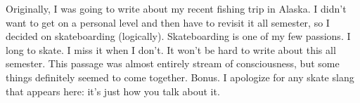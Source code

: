 Originally, I was going to write about my recent fishing trip in Alaska. I didn't want to get on a personal level and then have to revisit it all semester, so I decided on skateboarding (logically). Skateboarding is one of my few passions. I long to skate. I miss it when I don't. It won't be hard to write about this all semester. This passage was almost entirely stream of consciousness, but some things definitely seemed to come together. Bonus. I apologize for any skate slang that appears here: it's just how you talk about it.
